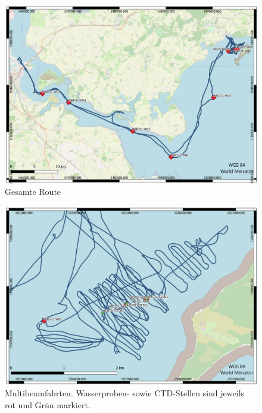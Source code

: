 \begin{figure}[]
    \centering
    \includegraphics[width=1\linewidth]{Bilder/QGIS/Gesamte_route.png}
    \caption{Gesamte Route}
    \label{fig:route}
\end{figure}
\begin{figure}
    \centering
    \includegraphics[width=1\linewidth]{Bilder/QGIS/multibeam.png}
    \caption{Multibeamfahrten. Wasserproben- sowie CTD-Stellen sind jeweils rot und Grün markiert.}
    \label{fig:multibeam_route}
\end{figure}
